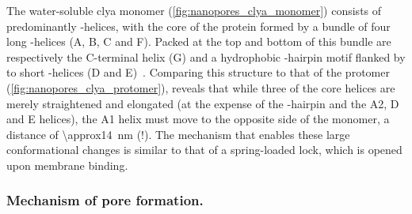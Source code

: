 The water-soluble \gls{clya} monomer (\cref{fig:nanopores_clya_monomer}) consists of predominantly
\ta-helices, with the core of the protein formed by a bundle of four long \ta-helices (\ta A, \ta B, \ta C and
\ta F). Packed at the top and bottom of this bundle are respectively the C-terminal helix (\ta G) and a
hydrophobic \tb-hairpin motif flanked by to short \ta-helices (\ta D and \ta
E)~\cite{Wallace-2000,Mueller-2009}. Comparing this structure to that of the protomer
(\cref{fig:nanopores_clya_protomer}), reveals that while three of the core helices are merely straightened and
elongated (at the expense of the \tb-hairpin and the \ta A2, \ta D and \ta E helices), the \ta A1 helix must
move to the opposite side of the monomer, a distance of \SI{\approx14}{\nm} (!). The mechanism that enables
these large conformational changes is similar to that of a spring-loaded lock, which is opened upon membrane
binding.

\subsubsection{Mechanism of pore formation.}
%

